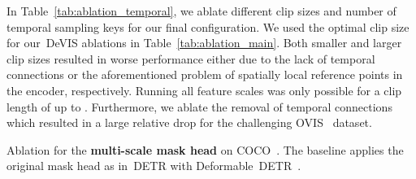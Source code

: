 \documentclass[runningheads]{llncs}
\newcommand{\detr}{\mbox{DETR}}
\newcommand{\evis}{\mbox{DeVIS}}
\begin{document}
In Table~\ref{tab:ablation_temporal}, we ablate different clip sizes  and number of temporal sampling keys  for our final configuration.
We used the optimal clip size  for our~\evis{} ablations in Table~\ref{tab:ablation_main}.
Both smaller and larger clip sizes resulted in worse performance either due to the lack of temporal connections or the aforementioned problem of spatially local reference points in the encoder, respectively.
Running all  feature scales was only possible for a clip length of up to .
Furthermore, we ablate the removal of temporal connections which resulted in a large relative drop for the challenging OVIS~\cite{ovis} dataset.

\begin{table*}[t]
\parbox[t][][t]{.48\linewidth}{

\centering

\caption{Ablation for the \textbf{multi-scale mask head} on COCO~\cite{COCO}.
The baseline applies the original mask head as in~\detr{} with Deformable~\detr{}~\cite{deformable_detr}.
}
\label{tab:ablation_mask_head}

}\hfill
\parbox[t][][t]{.48\linewidth}{
\centering

\caption{
Removing \textbf{temporal connections} with  results in performance drops across all datasets.
We observe an optimal clip size of .
}
 
}
\end{table*}
\end{document}
